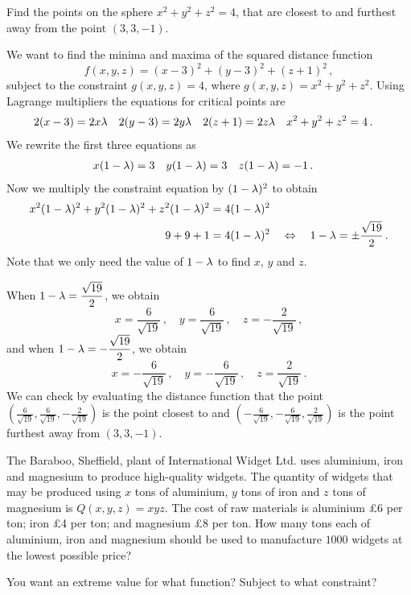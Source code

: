 \begin{question}
Find the points on the sphere $x^2+y^2+z^2=4$, that are closest to and furthest away from the point $(3,3,-1)$.
\end{question}

\begin{solution}
We want to find the minima and maxima of the squared distance function
\[
f(x,y,z) = (x-3)^2 + (y-3)^2 + (z+1)^2\,,
\]
subject to the constraint $g(x,y,z) = 4$, where
$g(x,y,z) = x^2 + y^2 + z^2$.
Using Lagrange multipliers the equations for critical points are
\begin{align*}
2(x-3) &= 2x\lambda &
2(y-3) &= 2y\lambda &
2(z+1) &= 2z\lambda &
x^2 + y^2 + z^2 &= 4\,.
\end{align*}
We rewrite the first three equations as
\begin{align*}
x(1-\lambda) &= 3 &
y(1-\lambda) &= 3 &
z(1-\lambda) &= -1\,.
\end{align*}
Now we multiply the constraint equation by $(1-\lambda)^2$ to obtain
\begin{align*}
x^2(1-\lambda)^2 + y^2(1-\lambda)^2 + z^2(1-\lambda)^2 &= 4(1-\lambda)^2 \\
9 + 9 + 1 &= 4(1-\lambda)^2 \quad\Leftrightarrow\quad
1-\lambda = \pm \frac{\sqrt{19}}2\,.
\end{align*}
Note that we only need the value of $1-\lambda$ to find $x$, $y$ and $z$.

When $1-\lambda = \displaystyle \frac{\sqrt{19}}2$, we obtain
\[
x = \frac 6{\sqrt{19}}\,,\quad
y = \frac 6{\sqrt{19}}\,,\quad
z = -\frac 2{\sqrt{19}}\,,
\]
and when $1-\lambda = -\displaystyle \frac{\sqrt{19}}2$, we obtain
\[
x = -\frac 6{\sqrt{19}}\,,\quad
y = -\frac 6{\sqrt{19}}\,,\quad
z = \frac 2{\sqrt{19}}\,.
\]
We can check by evaluating the distance function that the point
$\displaystyle\left(\frac 6{\sqrt{19}}, \frac 6{\sqrt{19}}, -\frac 2{\sqrt{19}}\right)$
is the point closest to and
$\displaystyle\left(-\frac 6{\sqrt{19}}, -\frac 6{\sqrt{19}}, \frac 2{\sqrt{19}}\right)$
is the point furthest away from $(3,3,-1)$.
\end{solution}

\begin{question}
 The Baraboo, Sheffield, plant of International Widget Ltd. uses aluminium, iron and magnesium to produce high-quality widgets. The quantity of widgets that may be produced using $x$ tons of aluminium, $y$ tons of iron and $z$ tons of magnesium is $Q(x,y,z) = xyz$. The cost of raw materials is aluminium \pounds6 per ton; iron \pounds4 per ton; and magnesium \pounds8 per ton. How many tons each of aluminium, iron and magnesium should be used to manufacture $1000$ widgets at the lowest possible price?

\begin{hint*}
You want an extreme value for what function? Subject to what constraint?
\end{hint*}
\end{question}

